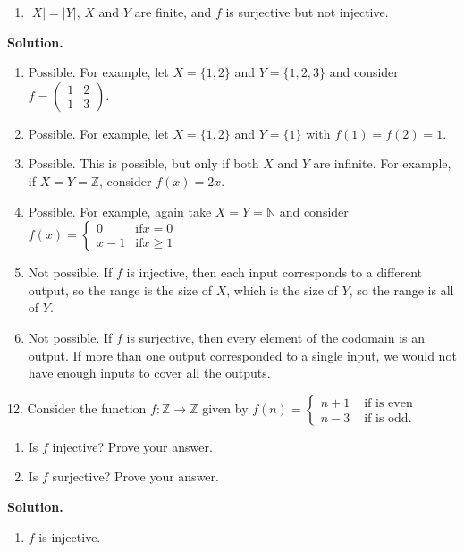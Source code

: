 \documentclass[10pt,]{book}
\theoremstyle{plain}
\theoremstyle{definition}
\theoremstyle{definition}
\theoremstyle{definition}
\numberwithin{equation}{section}
\def\N{\mathbb N}
\def\Z{\mathbb Z}
\newcommand{\amp}{ & }
\begin{document}
\begin{exerciselist}
\begin{enumerate}[label=(\alph*)]
\item\hypertarget{li-356}{}\(|X| = |Y|\), \(X\) and \(Y\) are finite, and \(f\) is surjective but not injective.%
\end{enumerate}
\par\smallskip
\par\smallskip
\noindent\textbf{Solution.}\hypertarget{solution-55}{}\quad
\leavevmode%
\begin{enumerate}[label=(\alph*)]
\item\hypertarget{li-357}{} Possible. For example, let \(X=\{1,2\}\) and \(Y = \{1,2,3\}\) and consider \(f=\begin{pmatrix}1 \amp 2 \\ 1 \amp 3\end{pmatrix}\). %
\item\hypertarget{li-358}{} Possible. For example, let \(X = \{1,2\}\) and \(Y = \{1\}\) with \(f(1) = f(2) = 1\).%
\item\hypertarget{li-359}{} Possible. This is possible, but only if both \(X\) and \(Y\) are infinite. For example, if \(X = Y = \Z\), consider \(f(x) = 2x\).%
\item\hypertarget{li-360}{} Possible. For example, again take \(X = Y = \N\) and consider \(f(x) = \begin{cases} 0 \amp \mathrm{ if } x = 0 \\ x-1 \amp \mathrm{ if } x \ge 1\end{cases}\)%
\item\hypertarget{li-361}{} Not possible. If \(f\) is injective, then each input corresponds to a different output, so the range is the size of \(X\), which is the size of \(Y\), so the range is all of \(Y\).%
\item\hypertarget{li-362}{} Not possible. If \(f\) is surjective, then every element of the codomain is an output. If more than one output corresponded to a single input, we would not have enough inputs to cover all the outputs.%
\end{enumerate}
\item[12.]\hypertarget{exercise-38}{}
            Consider the function \(f:\Z \to \Z\) given by \(f(n) = \begin{cases}n+1 \amp  \mbox{ if  is even} \\ n-3 \amp \mbox{ if  is odd} . \end{cases}
            \)
\leavevmode%
\begin{enumerate}[label=(\alph*)]
\item\hypertarget{li-363}{}
                Is \(f\) injective? Prove your answer.
\item\hypertarget{li-364}{}
                Is \(f\) surjective? Prove your answer.
\end{enumerate}
\par\smallskip
\par\smallskip
\noindent\textbf{Solution.}\hypertarget{solution-56}{}\quad
\leavevmode%
\begin{enumerate}[label=(\alph*)]
\item\hypertarget{li-365}{}\(f\) is injective.


\end{enumerate}
\end{exerciselist}
\end{document}
